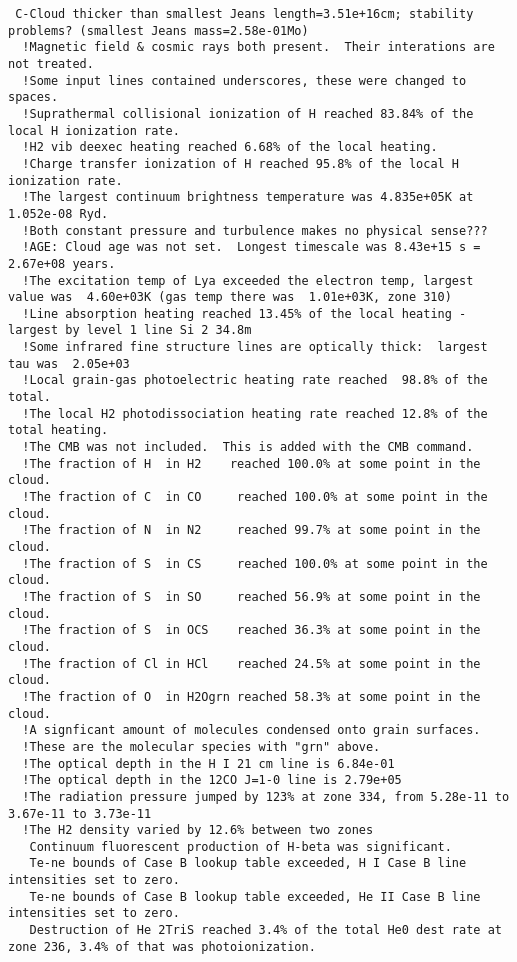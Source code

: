 {\setverbatimfontsize{\tiny}
\begin{verbatim}
 C-Cloud thicker than smallest Jeans length=3.51e+16cm; stability problems? (smallest Jeans mass=2.58e-01Mo)
  !Magnetic field & cosmic rays both present.  Their interations are not treated.
  !Some input lines contained underscores, these were changed to spaces.
  !Suprathermal collisional ionization of H reached 83.84% of the local H ionization rate.
  !H2 vib deexec heating reached 6.68% of the local heating.
  !Charge transfer ionization of H reached 95.8% of the local H ionization rate.
  !The largest continuum brightness temperature was 4.835e+05K at 1.052e-08 Ryd.
  !Both constant pressure and turbulence makes no physical sense???
  !AGE: Cloud age was not set.  Longest timescale was 8.43e+15 s = 2.67e+08 years.
  !The excitation temp of Lya exceeded the electron temp, largest value was  4.60e+03K (gas temp there was  1.01e+03K, zone 310)
  !Line absorption heating reached 13.45% of the local heating - largest by level 1 line Si 2 34.8m
  !Some infrared fine structure lines are optically thick:  largest tau was  2.05e+03
  !Local grain-gas photoelectric heating rate reached  98.8% of the total.
  !The local H2 photodissociation heating rate reached 12.8% of the total heating.
  !The CMB was not included.  This is added with the CMB command.
  !The fraction of H  in H2    reached 100.0% at some point in the cloud.
  !The fraction of C  in CO     reached 100.0% at some point in the cloud.
  !The fraction of N  in N2     reached 99.7% at some point in the cloud.
  !The fraction of S  in CS     reached 100.0% at some point in the cloud.
  !The fraction of S  in SO     reached 56.9% at some point in the cloud.
  !The fraction of S  in OCS    reached 36.3% at some point in the cloud.
  !The fraction of Cl in HCl    reached 24.5% at some point in the cloud.
  !The fraction of O  in H2Ogrn reached 58.3% at some point in the cloud.
  !A signficant amount of molecules condensed onto grain surfaces.
  !These are the molecular species with "grn" above.
  !The optical depth in the H I 21 cm line is 6.84e-01
  !The optical depth in the 12CO J=1-0 line is 2.79e+05
  !The radiation pressure jumped by 123% at zone 334, from 5.28e-11 to 3.67e-11 to 3.73e-11
  !The H2 density varied by 12.6% between two zones
   Continuum fluorescent production of H-beta was significant.
   Te-ne bounds of Case B lookup table exceeded, H I Case B line intensities set to zero.
   Te-ne bounds of Case B lookup table exceeded, He II Case B line intensities set to zero.
   Destruction of He 2TriS reached 3.4% of the total He0 dest rate at zone 236, 3.4% of that was photoionization.

\end{verbatim}}
